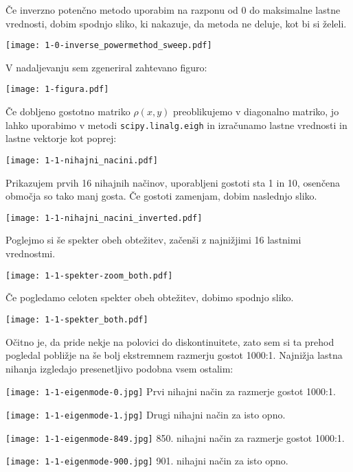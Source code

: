 \documentclass[a4paper,oneside,12pt]{article}
\begin{document}
Če inverzno potenčno metodo uporabim na razponu od 0 do maksimalne lastne vrednosti, dobim spodnjo sliko, ki nakazuje, da metoda ne deluje, kot bi si želeli.
\begin{center}
    \texttt{[image: 1-0-inverse\_powermethod\_sweep.pdf]}
\end{center}
V nadaljevanju sem zgeneriral zahtevano figuro:
\begin{center}
    \texttt{[image: 1-figura.pdf]}
\end{center}

Če dobljeno gostotno matriko $\rho(x,y)$ preoblikujemo v diagonalno matriko, jo lahko uporabimo v metodi \texttt{scipy.linalg.eigh} in izračunamo lastne vrednosti in lastne vektorje kot poprej:
\begin{center}
    \texttt{[image: 1-1-nihajni\_nacini.pdf]}
\end{center}
Prikazujem prvih 16 nihajnih načinov, uporabljeni gostoti sta 1 in 10, osenčena območja so tako manj gosta. Če gostoti zamenjam, dobim naslednjo sliko.
\begin{center}
    \texttt{[image: 1-1-nihajni\_nacini\_inverted.pdf]}
\end{center}
Poglejmo si še spekter obeh obtežitev, začenši z najnižjimi 16 lastnimi vrednostmi.
\begin{center}
    \texttt{[image: 1-1-spekter-zoom\_both.pdf]}
\end{center}
Če pogledamo celoten spekter obeh obtežitev, dobimo spodnjo sliko.
\begin{center}
    \texttt{[image: 1-1-spekter\_both.pdf]}
\end{center}
Očitno je, da pride nekje na polovici do diskontinuitete, zato sem si ta prehod pogledal pobližje na še bolj ekstremnem razmerju gostot 1000:1. Najnižja lastna nihanja izgledajo presenetljivo podobna vsem ostalim:
\begin{center}
    \centering
        \begin{minipage}{0.45\textwidth}
        \centering
    \texttt{[image: 1-1-eigenmode-0.jpg]}
    Prvi nihajni način za razmerje gostot 1000:1.
    \end{minipage}\hfill
    \begin{minipage}{0.45\textwidth}
        \centering
        \texttt{[image: 1-1-eigenmode-1.jpg]}
        Drugi nihajni način za isto opno.
    \end{minipage}
    \begin{minipage}{0.45\textwidth}
        \centering
    \texttt{[image: 1-1-eigenmode-849.jpg]}
    850. nihajni način za razmerje gostot 1000:1.
    \end{minipage}\hfill
    \begin{minipage}{0.45\textwidth}
        \centering
        \texttt{[image: 1-1-eigenmode-900.jpg]}
        901. nihajni način za isto opno.
    \end{minipage}
\end{center}
\end{document}
